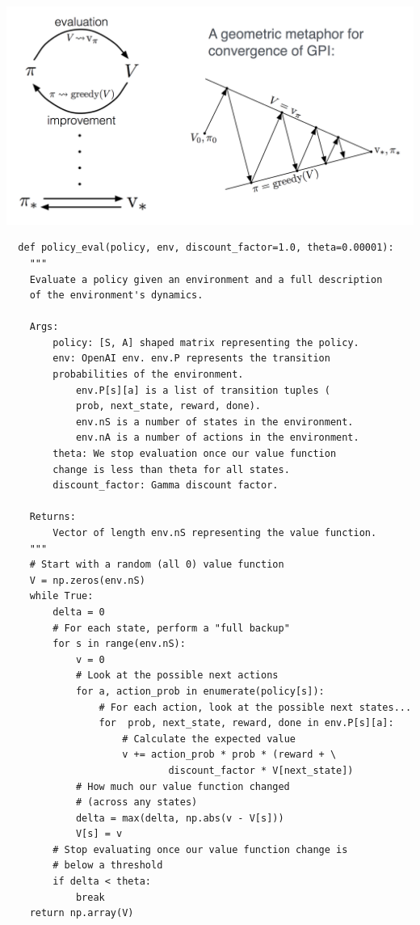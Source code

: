 \documentclass[graybox]{svmult}
\begin{document}
\includegraphics[width=\textwidth]{policy_iter.png}


\begin{verbatim}
  def policy_eval(policy, env, discount_factor=1.0, theta=0.00001):
    """
    Evaluate a policy given an environment and a full description 
    of the environment's dynamics.

    Args:
        policy: [S, A] shaped matrix representing the policy.
        env: OpenAI env. env.P represents the transition 
        probabilities of the environment.
            env.P[s][a] is a list of transition tuples (
            prob, next_state, reward, done).
            env.nS is a number of states in the environment.
            env.nA is a number of actions in the environment.
        theta: We stop evaluation once our value function 
        change is less than theta for all states.
        discount_factor: Gamma discount factor.

    Returns:
        Vector of length env.nS representing the value function.
    """
    # Start with a random (all 0) value function
    V = np.zeros(env.nS)
    while True:
        delta = 0
        # For each state, perform a "full backup"
        for s in range(env.nS):
            v = 0
            # Look at the possible next actions
            for a, action_prob in enumerate(policy[s]):
                # For each action, look at the possible next states...
                for  prob, next_state, reward, done in env.P[s][a]:
                    # Calculate the expected value
                    v += action_prob * prob * (reward + \ 
                            discount_factor * V[next_state])
            # How much our value function changed 
            # (across any states)
            delta = max(delta, np.abs(v - V[s]))
            V[s] = v
        # Stop evaluating once our value function change is 
        # below a threshold
        if delta < theta:
            break
    return np.array(V)
\end{verbatim}
\end{document}
